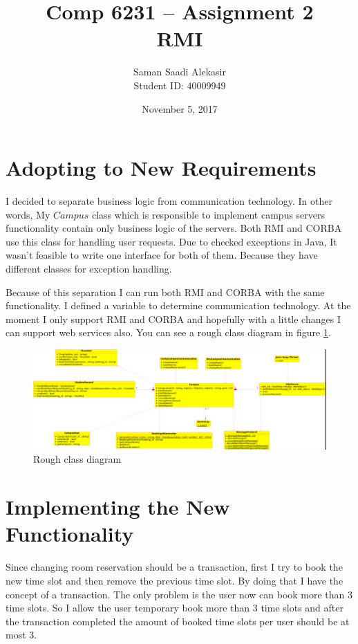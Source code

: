 \documentclass[12pt]{article}
\title{Comp 6231 -- Assignment 2\\RMI}
\author{Saman Saadi Alekasir\\Student ID: 40009949}
\date{November 5, 2017}
\begin{document}
\begin{titlepage}
\clearpage
{}
\maketitle
\thispagestyle{empty}
\end{titlepage}

\section{Adopting to New Requirements}
I decided to separate business logic from communication technology. In other words, My $Campus$ class which is responsible to implement campus servers functionality contain only business logic of the servers. Both RMI and CORBA use this class for handling user requests. Due to checked exceptions in Java, It wasn't feasible to write one interface for both of them. Because they have different classes for exception handling.
\par Because of this separation I can run both RMI and CORBA with the same functionality. I defined a variable to determine communication technology. At the moment I only support RMI and CORBA and hopefully with a little changes I can support web services also. You can see a rough class diagram in figure \ref{fig:class_diagram}.

\begin{figure}
\caption{Rough class diagram}
\centering
\label{fig:class_diagram}
\includegraphics[width=\linewidth]{img/class_diagram.png}
\end{figure}

\section{Implementing the New Functionality}

Since changing room reservation should be a transaction, first I try to book the new time slot and then remove the previous time slot. By doing that I have the concept of a transaction. The only problem is the user now can book more than 3 time slots. So I allow the user temporary book more than 3 time slots and after the transaction completed the amount of booked time slots per user should be at most 3.
\end{document}
